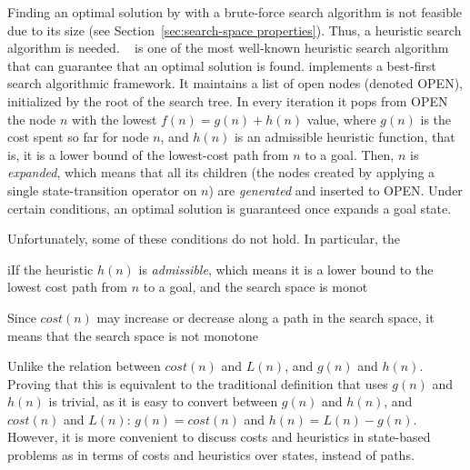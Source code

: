 {Finding an optimal solution by with a brute-force search algorithm is not feasible due to its size (see Section~\ref{sec:search-space properties}). Thus, a heuristic search algorithm is needed. 
\astar{}~\cite{hart1968formal} is one of the most well-known heuristic search  algorithm that can guarantee that an optimal solution is found. \astar{} implements a best-first search algorithmic framework. It maintains a list of open nodes (denoted OPEN), initialized by the root of the search tree. 
In every iteration it pops from OPEN the node $n$ with the lowest $f(n)=g(n)+h(n)$ value, 
where $g(n)$ is the cost spent so far for node $n$, and $h(n)$ is an admissible heuristic function, that is, it is a lower bound of the lowest-cost path from $n$ to a goal. Then, $n$ is {\em expanded}, which means that all its children (the nodes created by applying a single state-transition operator on $n$) are {\em generated} and inserted to OPEN.
Under certain conditions, an optimal solution is guaranteed once \astar{} expands a goal state. 


Unfortunately, some of these conditions do not hold. In particular, the 

iIf the heuristic $h(n)$ is \emph{admissible}, which means it is a lower bound to the lowest cost path from $n$ to a goal, and the search space is monot





Since $cost(n)$  
may increase or decrease along a path in the search space, it means that the search space is not monotone


Unlike 
the relation between $cost(n)$ and $L(n)$, and $g(n)$ and $h(n)$. 
Proving that this \astar{} is equivalent to the traditional \astar{} definition that uses $g(n)$ and $h(n)$ is trivial, 
as it is easy to convert between $g(n)$ and $h(n)$, and $cost(n)$ and $L(n)$: 
$g(n)=cost(n)$ and $h(n)=L(n)-g(n)$. 
However, it is more convenient to discuss costs and heuristics in state-based problems as \brpswc{} in terms of costs and heuristics over states, instead of paths.





}
